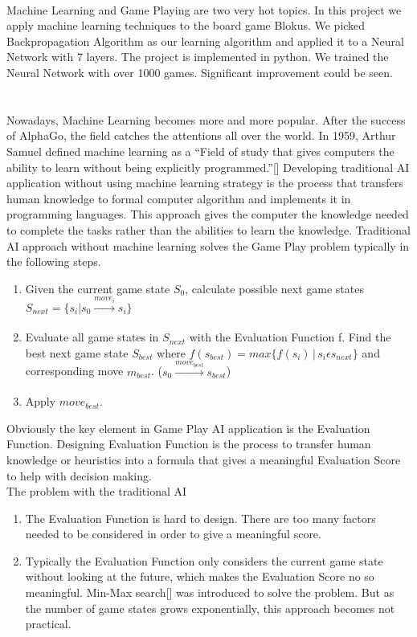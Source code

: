 \documentclass{report}
\begin{document}
	\\
		Machine Learning and Game Playing are two very hot topics. In this project we apply machine learning techniques to the board game Blokus. We picked Backpropagation Algorithm as
		our learning algorithm and applied it to a Neural Network with 7 layers. The project is implemented in python. We trained the Neural Network with over 1000 games. Significant
		improvement could be seen.\\ \\

	\\
	Nowadays, Machine Learning becomes more and more popular. After the success of AlphaGo, the field catches the attentions all over the world.  In 1959, Arthur Samuel defined machine
	learning as a ``Field of study that gives computers the ability to learn without being explicitly programmed.''[] Developing traditional AI application without using machine learning
	strategy is the process that transfers human knowledge to formal computer algorithm and implements it in programming languages. This approach gives the computer the knowledge needed
	to complete the tasks rather than the abilities to learn the knowledge. Traditional AI approach without machine learning solves the Game Play problem typically in the following steps.
	\begin{enumerate}
		\item Given the current game state $S_0$, calculate possible next game states $S_{next} = \{s_i|s_0\xrightarrow[]{move_i}s_i\}$

		\item Evaluate all game states in $S_{next}$ with the Evaluation Function f. Find the best next game state $S_{best}$ where $f(s_{best}) = max\{f(s_i)\,|\,s_i \epsilon s_{next}\}$ and corresponding
			move $m_{best}$. ($s_0 \xrightarrow[]{move_{best}} s_{best}$)
		\item Apply $move_{best}$.
	\end{enumerate}
	Obviously the key element in Game Play AI application is the Evaluation Function.  Designing Evaluation Function is the process to transfer human knowledge or heuristics into a formula
	that gives a meaningful Evaluation Score to help with decision making.\\
	The problem with the traditional AI
	\begin{enumerate}
		\item The Evaluation Function is hard to design. There are too many factors needed to be considered in order to give a meaningful score. 
		\item Typically the Evaluation Function only considers the current game state without looking at the future, which makes the Evaluation Score no so meaningful.  Min-Max search[]
		was introduced to solve the problem. But as the number of game states grows exponentially, this approach becomes not practical.
	\end{enumerate}
\end{document}
